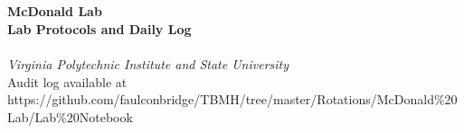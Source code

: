 
\begin{titlepage}
	{~ \\[5cm] }
	
	\noindent \HRule \\[0.4cm]
	{ \Huge \bfseries McDonald Lab \\[0.4cm] }
	{ \huge \bfseries Lab Protocols and Daily Log \\ }
	\HRule \\[0.4cm]
	
	{ \large \emph{Virginia Polytechnic Institute and State University} }\\[11cm]
	
	\noindent Audit log available at https://github.com/faulconbridge/TBMH/tree/master/Rotations/McDonald\%20Lab/Lab\%20Notebook
\end{titlepage}